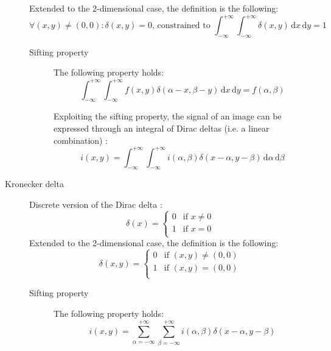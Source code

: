 \begin{description}
        Extended to the 2-dimensional case, the definition is the following:
        \[ \forall (x, y) \neq (0, 0): \delta(x, y) = 0 \text{, constrained to } \int_{-\infty}^{+\infty}\int_{-\infty}^{+\infty} \delta(x, y) \,\text{d}x\,\text{d}y = 1 \]

        \begin{description}
            \item[Sifting property] 
                The following property holds:
                \[ \int_{-\infty}^{+\infty}\int_{-\infty}^{+\infty} f(x, y) \delta(\alpha-x, \beta-y) \,\text{d}x\,\text{d}y = f(\alpha, \beta) \]
                
                \begin{remark}
                    Exploiting the sifting property, the signal of an image can be expressed through an integral of Dirac deltas 
                    (i.e. a linear combination) \cite{slides:filters, book:sonka}:
                    \[ i(x, y) = \int_{-\infty}^{+\infty}\int_{-\infty}^{+\infty} i(\alpha, \beta) \delta(x-\alpha, y-\beta) \,\text{d}\alpha\,\text{d}\beta \]
                \end{remark}
        \end{description}

    \item[Kronecker delta] 
        Discrete version of the Dirac delta \cite{wiki:kronecker}:
        \[ \delta(x) = \begin{cases}
            0 & \text{if $x \neq 0$} \\
            1 & \text{if $x = 0$} \\
        \end{cases} \]
        Extended to the 2-dimensional case, the definition is the following:
        \[ \delta(x, y) = \begin{cases}
            0 & \text{if $(x, y) \neq (0, 0)$} \\
            1 & \text{if $(x, y) = (0, 0)$} \\
        \end{cases} \]
        \begin{description}
            \item[Sifting property] 
                The following property holds:
                \[ i(x, y) = \sum_{\alpha=-\infty}^{+\infty} \sum_{\beta=-\infty}^{+\infty} i(\alpha, \beta) \delta(x-\alpha, y-\beta) \]
        \end{description}
\end{description}



